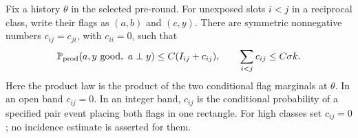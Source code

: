 \begin{lemma}\label{mark:collision}
Fix a history $\theta$ in the selected pre-round. For unexposed slots
$i<j$ in a reciprocal class, write their flags as $(a,b)$ and $(c,y)$.
There are symmetric nonnegative numbers $c_{ij}=c_{ji}$, with
$c_{ii}=0$, such that
\begin{equation}\label{mark:incidence-charge}
 \mathbb P_{\mathrm{prod}}(a,y\text{ good},\ a\perp y)
                   \le C(I_{ij}+c_{ij}),
 \qquad \sum_{i<j}c_{ij}\le C\sigma k.
\end{equation}
Here the product law is the product of the two conditional flag
marginals at $\theta$. In an open band $c_{ij}=0$. In an integer band,
$c_{ij}$ is the conditional probability of a specified pair event
placing both flags in one rectangle. For high classes set $c_{ij}=0$;
no incidence estimate is asserted for them.
\end{lemma}

